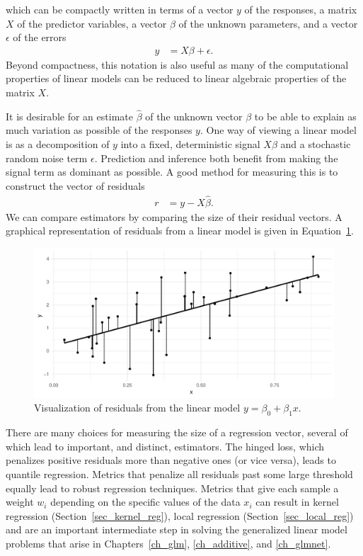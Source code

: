 \documentclass[12pt,hidelinks]{article}
\numberwithin{equation}{section}
\begin{document}
which can be compactly written in terms of a vector $y$ of the responses,
a matrix $X$ of the predictor variables, a vector $\beta$ of the unknown
parameters, and a vector $\epsilon$ of the errors
\begin{align}
y &= X \beta + \epsilon.
\end{align}
Beyond compactness, this notation is also useful as many of the computational
properties of linear models can be reduced to linear algebraic properties of
the matrix $X$.

It is desirable for an estimate $\widehat{\beta}$ of the unknown vector $\beta$
to be able to explain as much variation as possible of the responses $y$. One way
of viewing a linear model is as a decomposition of $y$ into a fixed, deterministic
signal $X\beta$ and a stochastic random noise term $\epsilon$. Prediction and
inference both benefit from making the signal term as dominant as possible. A
good method for measuring this is to construct the vector of residuals
\begin{align}
r &= y - X\widehat{\beta}.
\end{align}
We can compare estimators by comparing the size of their residual vectors.
A graphical representation of residuals from a linear model is given in
Equation~\ref{lm_residuals}.

\begin{figure}
\includegraphics[width=\textwidth]{figures/lm_residuals.pdf}
\caption[Residuals from a simple linear model]{Visualization of residuals
from the linear model $y = \beta_0 + \beta_1 x$.}
\label{lm_residuals}
\end{figure}

There are many choices for measuring the size of a regression vector,
several of which lead to important, and distinct, estimators. The hinged loss,
which penalizes positive residuals more than negative ones (or vice versa),
leads to quantile regression.
Metrics that penalize all residuals past some large threshold equally lead
to robust regression techniques. Metrics
that give each sample a weight $w_i$ depending on the specific values of the
data $x_i$ can result in kernel regression (Section~\ref{sec_kernel_reg}),
local regression (Section~\ref{sec_local_reg}) and are an important
intermediate step in solving the generalized linear model problems that
arise in Chapters~\ref{ch_glm}, \ref{ch_additive}, and \ref{ch_glmnet}.
\end{document}
